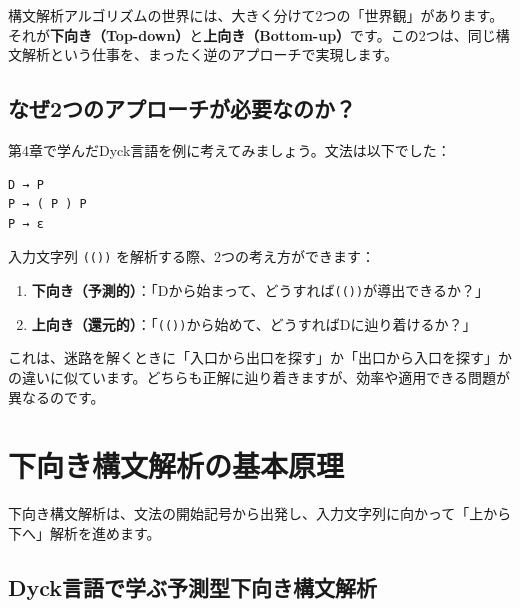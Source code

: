 構文解析アルゴリズムの世界には、大きく分けて2つの「世界観」があります。それが\textbf{下向き（Top-down）}と\textbf{上向き（Bottom-up）}です。この2つは、同じ構文解析という仕事を、まったく逆のアプローチで実現します。

\hypertarget{chapter5-ux306aux305c2ux3064ux306eux30a2ux30d7ux30edux30fcux30c1ux304cux5fc5ux8981ux306aux306eux304b}{%
\subsection{なぜ2つのアプローチが必要なのか？}\label{chapter5-ux306aux305c2ux3064ux306eux30a2ux30d7ux30edux30fcux30c1ux304cux5fc5ux8981ux306aux306eux304b}}

第4章で学んだDyck言語を例に考えてみましょう。文法は以下でした：

\begin{verbatim}
D → P
P → ( P ) P
P → ε
\end{verbatim}

入力文字列 \texttt{(())} を解析する際、2つの考え方ができます：

\begin{enumerate}
\def\labelenumi{\arabic{enumi}.}
\tightlist
\item
  \textbf{下向き（予測的）}：「Dから始まって、どうすれば\texttt{(())}が導出できるか？」
\item
  \textbf{上向き（還元的）}：「\texttt{(())}から始めて、どうすればDに辿り着けるか？」
\end{enumerate}

これは、迷路を解くときに「入口から出口を探す」か「出口から入口を探す」かの違いに似ています。どちらも正解に辿り着きますが、効率や適用できる問題が異なるのです。

\hypertarget{chapter5-ux4e0bux5411ux304dux69cbux6587ux89e3ux6790ux306eux57faux672cux539fux7406}{%
\section{下向き構文解析の基本原理}\label{chapter5-ux4e0bux5411ux304dux69cbux6587ux89e3ux6790ux306eux57faux672cux539fux7406}}

下向き構文解析は、文法の開始記号から出発し、入力文字列に向かって「上から下へ」解析を進めます。

\hypertarget{chapter5-dyckux8a00ux8a9eux3067ux5b66ux3076ux4e88ux6e2cux578bux4e0bux5411ux304dux69cbux6587ux89e3ux6790}{%
\subsection{Dyck言語で学ぶ予測型下向き構文解析}\label{chapter5-dyckux8a00ux8a9eux3067ux5b66ux3076ux4e88ux6e2cux578bux4e0bux5411ux304dux69cbux6587ux89e3ux6790}}

